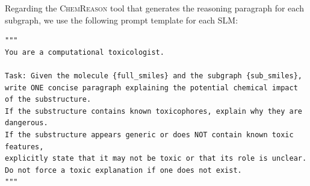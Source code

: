 \documentclass[
]{ceurart}
\newcommand{\tool}[1]{\textsc{#1}}
\begin{document}
\noindent Regarding the \tool{ChemReason} tool that generates the reasoning paragraph for each subgraph, we use the following prompt template for each SLM:

\begin{lstlisting}[style=mystyle]
"""    
You are a computational toxicologist.

Task: Given the molecule {full_smiles} and the subgraph {sub_smiles},
write ONE concise paragraph explaining the potential chemical impact of the substructure.
If the substructure contains known toxicophores, explain why they are dangerous.
If the substructure appears generic or does NOT contain known toxic features,
explicitly state that it may not be toxic or that its role is unclear. 
Do not force a toxic explanation if one does not exist.
"""
\end{lstlisting}
\end{document}

